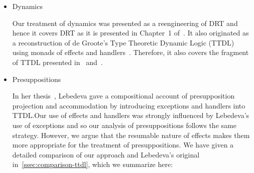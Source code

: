 \begin{itemize}
  We use deixis as the first example in
  Chapter~\ref{chap:introducing-effects}. Wanting to give an example of a
  handler for $\op{speaker}$ that appears within a lexical entry, we turned
  to direct quotations. However, the meanings that we give to sentences
  such as Example~\ref{ex:mary-peter} only express part of the
  meaning. Namely, we capture the fact Peter claims that Mary kissed
  him. Nevertheless, the sentence also entails that Peter uttered the
  sentence ``Mary kissed me''. Therefore, in our analysis, the sentence in
  Example~\ref{ex:mary-peter} would be judged equivalent to the sentence in
  Example~\ref{ex:peter-mary}. The meaning of direct quotation does not
  depend only on the meaning of the quoted clause, but on its exact
  form. Since our system is strictly compositional,\footnote{We are using
    abstract categorial grammars for the syntax-semantics interface.} we
  would need to make it so that the meaning of every sentence is the
  sentence itself. More elaborate treatments of quotation can be found
  in~\cite{geurts2003quotation,potts2007dimensions,shan2010character}.

  \begin{exe}
    \ex Peter said ``Mary kissed me''. \label{ex:mary-peter}
    \ex Peter said ``I was kissed by Mary''. \label{ex:peter-mary}
  \end{exe}

  
\item Dynamics

  Our treatment of dynamics was presented as a reengineering of DRT and
  hence it covers DRT as it is presented in Chapter~1
  of~\cite{kamp1993discourse}. It also originated as a reconstruction of de
  Groote's Type Theoretic Dynamic Logic (TTDL)~\cite{de2006towards} using
  monads of effects and handlers~\cite{marsik2014algebraic}. Therefore, it
  also covers the fragment of TTDL presented in~\cite{de2006towards}
  and~\cite{lebedeva2012expression}.


\item Presuppositions

  In her thesis~\cite{lebedeva2012expression}, Lebedeva gave a
  compositional account of presupposition projection and accommodation by
  introducing exceptions and handlers into TTDL.\@ Our use of effects and
  handlers was strongly influenced by Lebedeva's use of exceptions and so
  our analysis of presuppositions follows the same strategy. However, we
  argue that the resumable nature of effects makes them more appropriate
  for the treatment of presuppositions. We have given a detailed comparison
  of our approach and Lebedeva's original
  in~\ref{ssec:comparison-ttdl}, which we summarize here:


\end{itemize}
